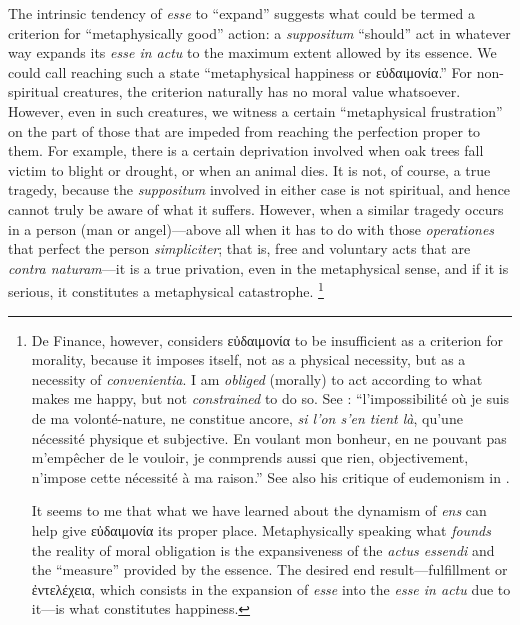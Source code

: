 The intrinsic tendency of \emph{esse} to “expand” suggests what could be termed a criterion for “metaphysically good” action: a \emph{suppositum} “should” act in whatever way expands its \emph{esse in actu} to the maximum extent allowed by its essence. We could call reaching such a state “metaphysical happiness or εὐδαιμονία.”
For non-spiritual creatures, the criterion naturally has no moral value whatsoever. However, even in such creatures, we witness a certain “metaphysical frustration” on the part of those that are impeded from reaching the perfection proper to them. For example, there is a certain deprivation involved when oak trees fall victim to blight or drought, or when an animal dies. It is not, of course, a true tragedy, because the \emph{suppositum} involved in either case is not spiritual, and hence cannot truly be aware of what it suffers. However, when a similar tragedy occurs in a person (man or angel)—above all when it has to do with those \emph{operationes} that perfect the person \emph{simpliciter}; that is, free and voluntary acts that are \emph{contra naturam}—it is a true privation, even in the metaphysical sense, and if it is serious, it constitutes a metaphysical catastrophe.%
%
\footnote{De Finance, however, considers εὐδαιμονία to be insufficient as a criterion for morality, because it imposes itself, not as a physical necessity, but as a necessity of \emph{convenientia}. I am \emph{obliged} (morally) to act according to what makes me happy, but not \emph{constrained} to do so. See \cite[259]{definance:essai}: “l’impossibilité où je suis  de ma volonté-nature, ne constitue ancore, \emph{si l’on s’en tient là}, qu’une nécessité physique et subjective. En voulant mon bonheur, en ne pouvant pas m’empêcher de le vouloir, je conmprends aussi que rien, objectivement, n’impose cette nécessité à ma raison.” See also his critique of eudemonism in \cite[114–119]{definance:ethique}.

It seems to me that what we have learned about the dynamism of \emph{ens} can help give εὐδαιμονία its proper place. Metaphysically speaking what \emph{founds} the reality of moral obligation is the expansiveness of the \emph{actus essendi} and the “measure” provided by the essence. The desired end result—fulfillment or ἐντελέχεια, which consists in the expansion of \emph{esse} into the \emph{esse in actu} due to it—is what constitutes happiness.}
%

